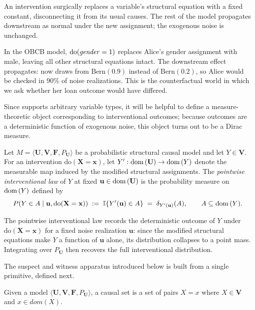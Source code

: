 \medskip\noindent An intervention surgically replaces a variable's structural equation with a fixed constant, 
disconnecting it from its usual causes. The rest of the model propagates downstream as normal under the new assignment;
 the exogenous noise is unchanged.

In the OBCB model, $\mathrm{do}(\varname{gender}=1)$ replaces Alice's gender assignment with male, leaving all other structural equations intact. The downstream effect propagates:  now draws from $\mathrm{Bern}(0.9)$ instead of $\mathrm{Bern}(0.2)$, so Alice would be checked in 90\% of noise realizations. This is the counterfactual world in which we ask whether her loan outcome would have differed.

Since \ourapproach supports arbitrary variable types, it will be helpful to define a measure-theoretic object corresponding to interventional outcomes; because outcomes are a deterministic function of exogenous noise, this object turns out to be a Dirac measure.

\begin{definition} \label{def:interlaw}
Let $M=\langle \mathbf{U},\mathbf{V},\mathbf{F},P_{\mathbf{U}}\rangle$ be a probabilistic
structural causal model and let $Y\in\mathbf{V}$.
For an intervention $\mathrm{do}(\mathbf{X}=\mathbf{x})$, let
$Y':\operatorname{dom}\,(\mathbf{U})\to\operatorname{dom}\,(Y)$ denote the measurable map induced by the
modified structural assignments.
The \emph{pointwise interventional law} of $Y$ at fixed $\mathbf{u}\in\operatorname{dom}\,(\mathbf{U})$ is the probability measure on
$\operatorname{dom}\,(Y)$ defined by
\[
P\!\left(Y\in A \mid \mathbf{u},\mathrm{do}(\mathbf{X}=\mathbf{x})\right)
\;:=\;
\mathbb{I}\!\left\{Y'(\mathbf{u})\in A\right\}
\;=\;\delta_{Y'(\mathbf{u})}(A),
\qquad
A\subseteq\operatorname{dom}\,(Y).
\]
\end{definition}

\medskip\noindent The pointwise interventional law records the deterministic
outcome of $Y$ under $\mathrm{do}(\mathbf{X}=\mathbf{x})$ for a fixed noise realization
$\mathbf{u}$: since the modified structural equations make $Y$ a function of $\mathbf{u}$
alone, its distribution collapses to a point mass. Integrating over $P_{\mathbf{U}}$
then recovers the full interventional distribution.

The suspect and witness apparatus introduced below is built from a single primitive, defined next.

\begin{definition}
Given a model \(\langle \mathbf{U}, \mathbf{V}, \mathbf{F}, P_{\mathbf{U}}\rangle\), a causal set is a set of pairs $X = x$ where $X \in \mathbf{V}$ and $x \in \mathit{dom}(X)$.
\end{definition}

